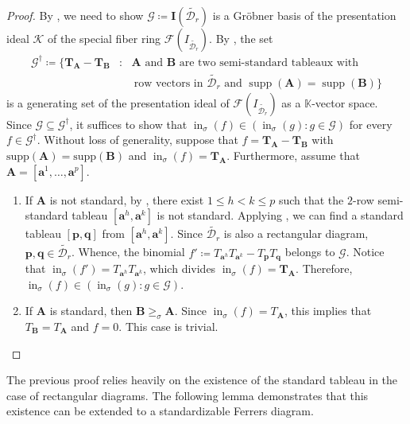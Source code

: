 \documentclass[11pt,a4paper,reqno,dvipsnames]{amsart}
\theoremstyle{plain}
\theoremstyle{definition}
\newtheorem{Assumptions and Discussion}[Theorem]{Assumptions and Discussion}
\theoremstyle{remark}
\def\ini{\operatorname{in}} %
\def\KK{{\mathbb K}}
\def\supp{\operatorname{supp}}
\newcommand\bda{{\bm a}}
\newcommand\bdp{{\bm p}}
\newcommand\bdq{{\bm q}}
\newcommand\bdT{{\bm T}}
\newcommand\bfA{\mathbf{A}}
\newcommand\bfB{\mathbf{B}}
\newcommand\bfI{\mathbf{I}}
\newcommand\calD{\mathcal{D}}
\newcommand\calF{\mathcal{F}}
\newcommand\calG{\mathcal{G}}
\newcommand\calK{\mathcal{K}}
\begin{document}
\begin{proof}
    By , we need to show  $\calG\coloneqq \bfI(\widetilde{\calD_r})$ is a Gr\"{o}bner basis of the presentation ideal $\calK$ of the special fiber ring $\calF(I_{\widetilde{\calD_r}})$. By \cite[Lemma 4.1]{Sturmfels}, the set
    \begin{align*}
        \calG^\dag\coloneqq \{\bdT_{\bfA}-\bdT_{\bfB} &: \text{ $\bfA$ and $\bfB$ are two semi-standard tableaux with}\\
        & \quad \text{ row vectors in $\widetilde{\calD_r}$ and $\supp(\bfA)=\supp(\bfB)$}\}
    \end{align*}
    is a generating set of the presentation ideal of $\calF(I_{\widetilde{\calD_r}})$ as a $\KK$-vector space. Since $\calG\subseteq \calG^\dag$, it suffices to show that $\ini_\sigma(f)\in (\ini_\sigma(g):g\in \calG)$ for every $f\in\calG^\dag$. Without loss of generality, suppose that $f=\bdT_{\bfA}-\bdT_{\bfB}$ with $\text{supp}(\bfA)=\text{supp}(\bfB)$ and $\ini_{\sigma }(f)=\bdT_{\bfA}$. Furthermore, assume that $\bfA=[\bda^1,\dots,\bda^p]$.
    \begin{enumerate}[a]
        \item If $\bfA$ is not standard, by , there exist $1\le h<k\le p$ such that the $2$-row semi-standard tableau $[\bda^h,\bda^k]$ is not standard. Applying , we can find a standard tableau $[\bdp,\bdq]$ from $[\bda^h,\bda^k]$. Since $\widetilde{\calD_r}$ is also a rectangular diagram, $\bdp,\bdq\in \widetilde{\calD_r}$. Whence, the binomial $f'\coloneqq T_{\bda^h}T_{\bda^k}-T_{\bdp}T_{\bdq}$ belongs to $\calG$. Notice that $\ini_\sigma(f')=T_{\bda^h}T_{\bda^k}$, which divides $\ini_\sigma(f)=\bdT_{\bfA}$.
            Therefore, $\ini_\sigma(f) \in (\ini_\sigma(g):g\in \calG)$.
        \item If $\bfA$ is standard, then $\bfB \geq_\sigma \bfA$. Since $\ini_\sigma(f)=T_\bfA$, this implies that $T_\bfB=T_\bfA$ and $f=0$. This case is trivial. \qedhere
    \end{enumerate}
\end{proof}


The previous proof relies heavily on the existence of the standard tableau in the case of rectangular diagrams. The following lemma demonstrates that this existence can be extended to a standardizable Ferrers diagram. 
\end{document}
